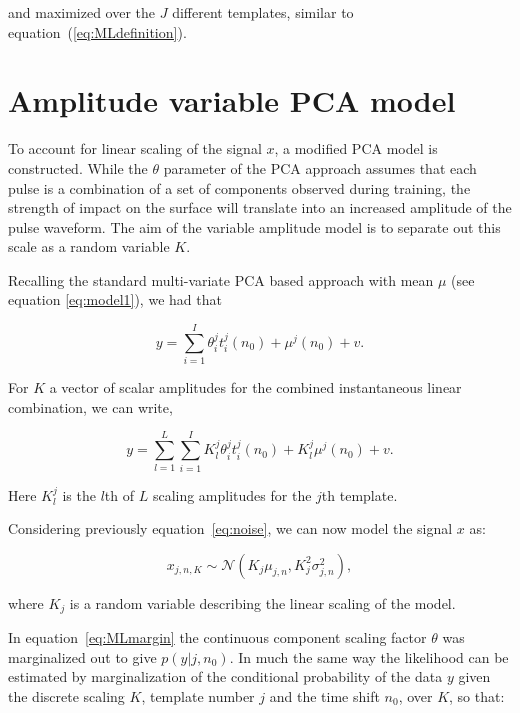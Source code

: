 and maximized over the $J$ different templates, similar to equation~(\ref{eq:MLdefinition}).

\section{Amplitude variable PCA model}\label{sec:KamplitudeModel}

To account for linear scaling of the signal $x$, a modified PCA model is constructed. While the $\theta$ parameter of the PCA approach assumes that each pulse is a combination of a set of components observed during training, the strength of impact on the surface will translate into an increased amplitude of the pulse waveform. The aim of the variable amplitude model is to separate out this scale as a random variable $K$.

Recalling the standard multi-variate PCA based approach with mean $\mu$ (see equation \ref{eq:model1}), we had that

\begin{equation}\label{eq:K_PCAmodel}
y = \sum^I_{i=1} \theta^j_i t^j_i(n_0) + \mu^j(n_0) + v.
\end{equation}

For $K$ a vector of scalar amplitudes for the combined instantaneous linear combination, we can write,

\begin{equation}\label{eq:Kmodel}
y = \sum^L_{l=1} \sum^I_{i=1} K^j_l \theta^j_i t^j_i(n_0) + K^j_l \mu^j(n_0) + v.
\end{equation}

Here $K^j_l$ is the $l$th of $L$ scaling amplitudes for the $j$th template.

Considering previously equation~\ref{eq:noise}, we can now model the signal $x$ as:

\begin{equation}\label{eq:GP2}
    x_{j,n,K} \sim \mathcal{N}(K_j \mu_{j,n} ,K_j^2 \sigma_{j,n}^2),
\end{equation}

where $K_j$ is a random variable describing the linear scaling of the model.

In equation~\ref{eq:MLmargin} the continuous component scaling factor $\theta$ was marginalized out to give $p(y|j,n_0)$. In much the same way the likelihood can be estimated by marginalization of the conditional probability of the data $y$ given the discrete scaling $K$, template number $j$ and the time shift $n_0$, over $K$, so that:

